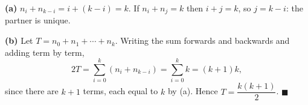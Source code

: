 \textbf{(a)} $n_i+n_{k-i}=i+(k-i)=k$. If $n_i+n_j=k$ then $i+j=k$, so $j=k-i$: the partner is unique.

\textbf{(b)} Let $T=n_0+n_1+\cdots+n_k$. Writing the sum forwards and backwards and adding term by term,
\[2T=\sum_{i=0}^{k}\left(n_i+n_{k-i}\right)=\sum_{i=0}^{k}k=(k+1)k,\]
since there are $k+1$ terms, each equal to $k$ by (a). Hence $T=\boxed{\dfrac{k(k+1)}{2}}$. $\blacksquare$
